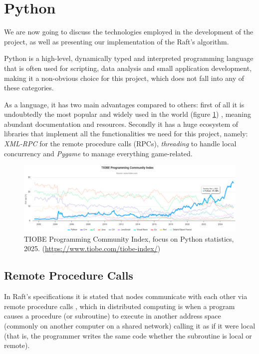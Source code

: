 \section{Python} \label{sec:python}

We \textcolor{changes}{are now going to discuss} the technologies employed in the development of the project, as well as presenting our implementation of the Raft's algorithm.

Python is a high-level, dynamically typed and interpreted programming language that is often used for scripting, data analysis and small application development, making it a non-obvious choice for this project, which does not fall into any of these categories.

As a language, it has two main advantages compared to others: first of all it is undoubtedly the most popular and widely used in the world (figure \ref{fig:tiobe}) \cite{tiobe,ieeeSpect}, meaning abundant documentation and resources. Secondly it has a huge ecosystem of libraries that implement all the functionalities we need for this project, namely: \textit{XML-RPC} for the remote procedure calls (RPCs), \textit{threading} to handle local concurrency and \textit{Pygame} to manage everything game-related.

\begin{figure}[h]
  \centering
  \includegraphics[width=\linewidth]{images/TIOBEindex.png}
  \caption{TIOBE Programming Community Index, focus on Python statistics, 2025. (\url{https://www.tiobe.com/tiobe-index/})}
  \label{fig:tiobe}
\end{figure}


\subsection{Remote Procedure Calls} \label{sec:xmlrpc}

In Raft's specifications it is stated that nodes communicate with each other via remote procedure calls \cite{raft}, which in distributed computing is when a program causes a procedure (or subroutine) to execute in another address space (commonly on another computer on a shared network) calling it as if it were local (that is, the programmer writes the same code whether the subroutine is local or remote).

